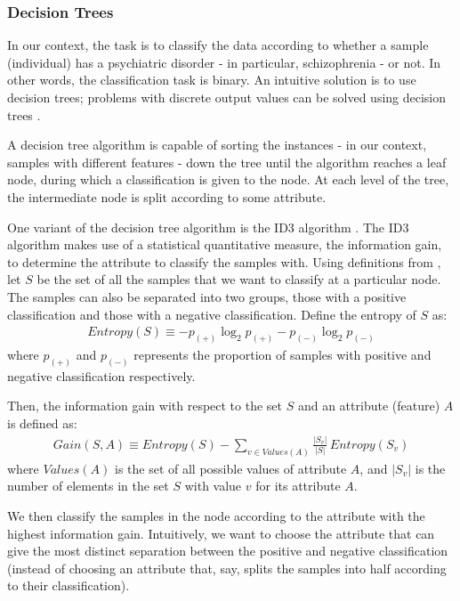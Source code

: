 \documentclass[12pt, twoside, a4paper]{article}
\begin{document}
\subsubsection{Decision Trees} \label{bg:ml:decisionTree}
In our context, the task is to classify the data according to whether a sample (individual) has a psychiatric disorder - in particular, schizophrenia - or not. In other words, the classification task is binary. An intuitive solution is to use decision trees; problems with discrete output values can be solved using decision trees \cite{RefWorks:98}.

A decision tree algorithm is capable of sorting the  instances - in our context, samples with different features - down the tree until the algorithm reaches a leaf node, during which a classification is given to the node. At each level of the tree, the intermediate node is split according to some attribute.

One variant of the decision tree algorithm is the ID3 algorithm \cite{RefWorks:99}. The ID3 algorithm makes use of a statistical quantitative measure, the information gain, to determine the attribute to classify the samples with. Using definitions from \cite{RefWorks:98}, let $S$ be the set of all the samples that we want to classify at a particular node. The samples can also be separated into two groups, those with a positive classification and those with a negative classification. Define the entropy of $S$ as:
\begin{align*}
Entropy(S) \equiv -p_{(+)} \log_2 p_{(+)} - p_{(-)} \log_2 p_{(-)}
\end{align*}
where $p_{(+)}$ and $p_{(-)}$ represents the proportion of samples with positive and negative classification respectively.

Then, the information gain with respect to the set $S$ and an attribute (feature) $A$ is defined as:
\begin{align*}
Gain(S, A) \equiv Entropy(S) - \sum_{v \in Values(A)} \frac{|S_v|}{|S|} \, Entropy(S_v)
\end{align*}
where $Values(A)$ is the set of all possible values of attribute $A$, and $|S_v|$ is the number of elements in the set $S$ with value $v$ for its attribute $A$.

We then classify the samples in the node according to the attribute with the highest information gain. Intuitively, we want to choose the attribute that can give the most distinct separation between the positive and negative classification (instead of choosing an attribute that, say, splits the samples into half  according to their classification).
\end{document}
